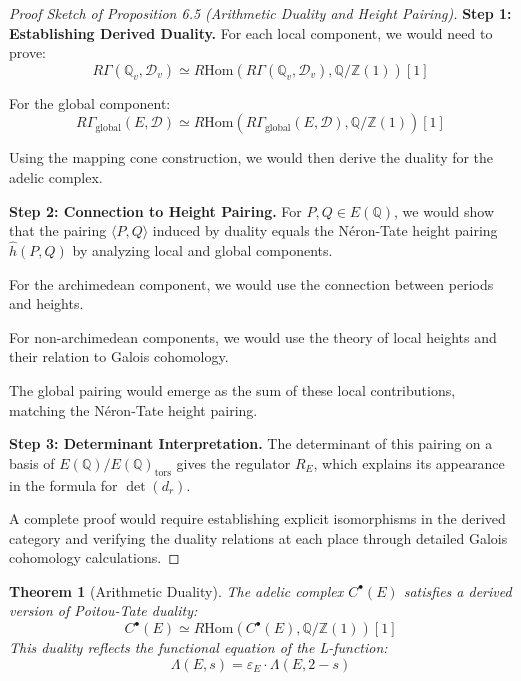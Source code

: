 \documentclass{article}
\theoremstyle{plain}
\newtheorem{theorem}{Theorem}[section]
\theoremstyle{definition}
\theoremstyle{remark}
\begin{document}
\begin{proof}[Proof Sketch of Proposition 6.5 (Arithmetic Duality and Height Pairing)]
\textbf{Step 1: Establishing Derived Duality.}
For each local component, we would need to prove:
\[
R\Gamma(\mathbb{Q}_v, \mathcal{D}_v) \simeq R\text{Hom}(R\Gamma(\mathbb{Q}_v, \mathcal{D}_v), \mathbb{Q}/\mathbb{Z}(1))[1]
\]

For the global component:
\[
R\Gamma_{\text{global}}(E, \mathcal{D}) \simeq R\text{Hom}(R\Gamma_{\text{global}}(E, \mathcal{D}), \mathbb{Q}/\mathbb{Z}(1))[1]
\]

Using the mapping cone construction, we would then derive the duality for the adelic complex.
\vspace{.3cm} 

\textbf{Step 2: Connection to Height Pairing.}
For $P, Q \in E(\mathbb{Q})$, we would show that the pairing $\langle P, Q \rangle$ induced by duality equals the Néron-Tate height pairing $\hat{h}(P, Q)$ by analyzing local and global components.

For the archimedean component, we would use the connection between periods and heights.

For non-archimedean components, we would use the theory of local heights and their relation to Galois cohomology.

The global pairing would emerge as the sum of these local contributions, matching the Néron-Tate height pairing.
\vspace{.3cm} 

\textbf{Step 3: Determinant Interpretation.}
The determinant of this pairing on a basis of $E(\mathbb{Q})/E(\mathbb{Q})_{\text{tors}}$ gives the regulator $R_E$, which explains its appearance in the formula for $\det(d_r)$.

A complete proof would require establishing explicit isomorphisms in the derived category and verifying the duality relations at each place through detailed Galois cohomology calculations.
\end{proof}

\begin{theorem}[Arithmetic Duality]
The adelic complex $C^\bullet(E)$ satisfies a derived version of Poitou-Tate duality:
\[
C^\bullet(E) \simeq R\text{Hom}(C^\bullet(E), \mathbb{Q}/\mathbb{Z}(1))[1]
\]
This duality reflects the functional equation of the L-function:
\[
\Lambda(E, s) = \varepsilon_E \cdot \Lambda(E, 2 - s)
\]
\end{theorem}
\end{document}
